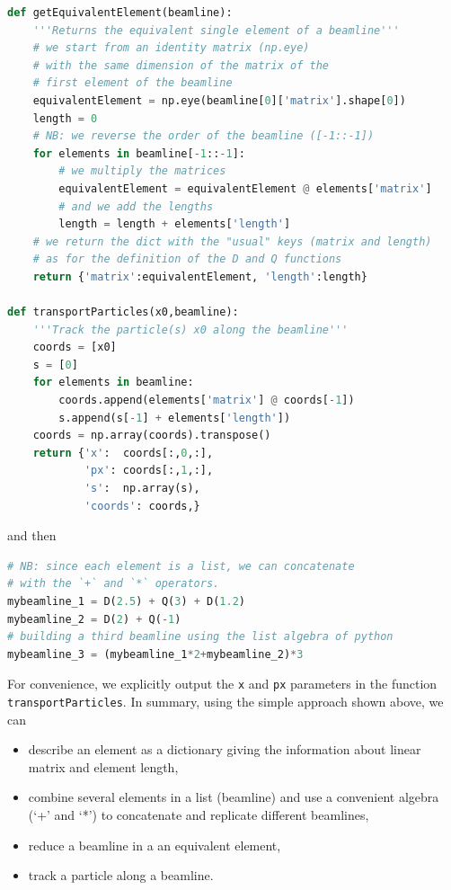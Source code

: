 \documentclass{article}
\begin{document}
\begin{lstlisting}[language=Python]
def getEquivalentElement(beamline):
    '''Returns the equivalent single element of a beamline'''
    # we start from an identity matrix (np.eye)
    # with the same dimension of the matrix of the
    # first element of the beamline
    equivalentElement = np.eye(beamline[0]['matrix'].shape[0])
    length = 0
    # NB: we reverse the order of the beamline ([-1::-1])
    for elements in beamline[-1::-1]:
        # we multiply the matrices 
        equivalentElement = equivalentElement @ elements['matrix']
        # and we add the lengths
        length = length + elements['length']
    # we return the dict with the "usual" keys (matrix and length)
    # as for the definition of the D and Q functions
    return {'matrix':equivalentElement, 'length':length}

def transportParticles(x0,beamline):
    '''Track the particle(s) x0 along the beamline'''
    coords = [x0]
    s = [0]
    for elements in beamline:
        coords.append(elements['matrix'] @ coords[-1])
        s.append(s[-1] + elements['length']) 
    coords = np.array(coords).transpose()
    return {'x':  coords[:,0,:],
            'px': coords[:,1,:],
            's':  np.array(s),
            'coords': coords,}
\end{lstlisting}
and then
\begin{lstlisting}[language=Python]
# NB: since each element is a list, we can concatenate 
# with the `+` and `*` operators.
mybeamline_1 = D(2.5) + Q(3) + D(1.2)
mybeamline_2 = D(2) + Q(-1)
# building a third beamline using the list algebra of python
mybeamline_3 = (mybeamline_1*2+mybeamline_2)*3
\end{lstlisting}



For convenience, we explicitly output the \texttt{x} and \texttt{px} parameters in the function \texttt{transportParticles}. In summary, using the simple approach shown above, we can

\begin{itemize}
    \item describe an element as a dictionary giving the information about linear matrix and element length,
    \item combine several elements in a list (beamline) and use a convenient algebra (`+' and `*') to concatenate and replicate different beamlines,
    \item reduce a beamline in a an equivalent element,
    \item track a particle along a beamline.
\end{itemize}
\end{document}
